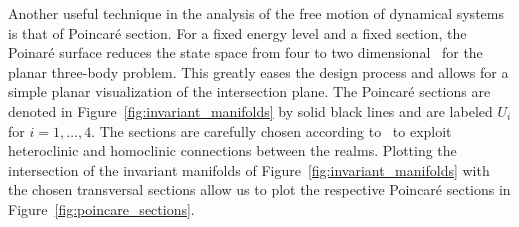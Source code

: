 Another useful technique in the analysis of the free motion of dynamical systems is that of Poincar\'e section.
For a fixed energy level and a fixed section, the Poinar\'e surface reduces the state space from four to two dimensional~\cite{koon2001} for the planar three-body problem.
This greatly eases the design process and allows for a simple planar visualization of the intersection plane.
The Poincar\'e sections are denoted in Figure~\ref{fig:invariant_manifolds} by solid black lines and are labeled \(U_i\) for \(i = 1,\hdots,4\).
The sections are carefully chosen according to~\cite{koon2000b} to exploit heteroclinic and homoclinic connections between the realms.
Plotting the intersection of the invariant manifolds of Figure~\ref{fig:invariant_manifolds} with the chosen transversal sections allow us to plot the respective Poincar\'e sections in Figure~\ref{fig:poincare_sections}.
